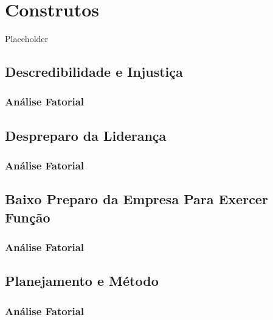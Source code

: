 \documentclass[]{book}
\begin{document}
\hypertarget{construtos}{%
\chapter{Construtos}\label{construtos}}

Placeholder

\hypertarget{descredibilidade-e-injustica}{%
\section{Descredibilidade e Injustiça}\label{descredibilidade-e-injustica}}

\hypertarget{analise-fatorial}{%
\subsection{Análise Fatorial}\label{analise-fatorial}}

\hypertarget{despreparo-da-lideranca}{%
\section{Despreparo da Liderança}\label{despreparo-da-lideranca}}

\hypertarget{analise-fatorial-1}{%
\subsection{Análise Fatorial}\label{analise-fatorial-1}}

\hypertarget{baixo-preparo-da-empresa-para-exercer-funcao}{%
\section{Baixo Preparo da Empresa Para Exercer Função}\label{baixo-preparo-da-empresa-para-exercer-funcao}}

\hypertarget{analise-fatorial-2}{%
\subsection{Análise Fatorial}\label{analise-fatorial-2}}

\hypertarget{planejamento-e-metodo}{%
\section{Planejamento e Método}\label{planejamento-e-metodo}}

\hypertarget{analise-fatorial-3}{%
\subsection{Análise Fatorial}\label{analise-fatorial-3}}
\end{document}
